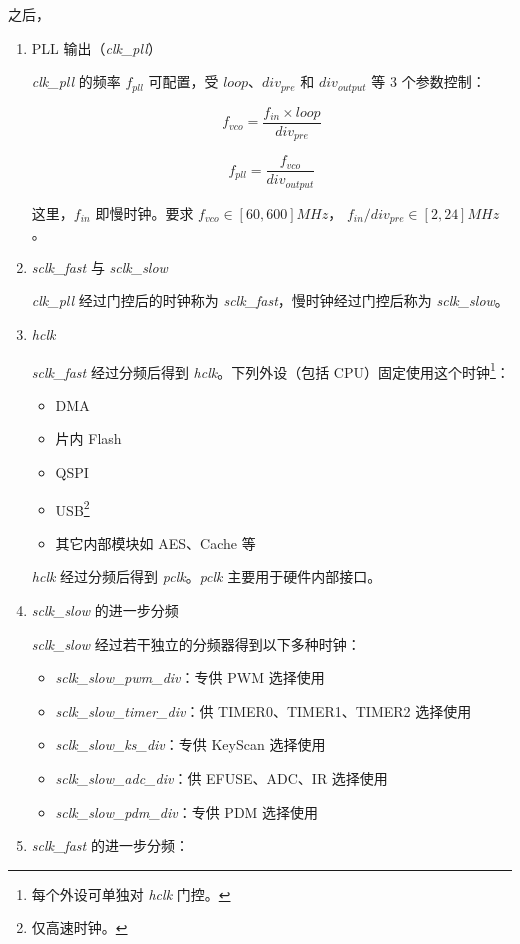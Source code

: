 \documentclass[
  12pt,
]{book}
\providecommand{\tightlist}{%
  \setlength{\itemsep}{0pt}\setlength{\parskip}{0pt}}
\begin{document}
之后，

\begin{enumerate}
\def\labelenumi{\arabic{enumi}.}
\item
  PLL 输出（\emph{clk\_pll}）

  \emph{clk\_pll} 的频率 \(f_{pll}\) 可配置，受 \(loop\)、\(div_{pre}\) 和 \(div_{output}\) 等 3 个参数控制：

  \[f_{vco}=\frac{f_{in}\times loop}{div_{pre}}\]

  \[f_{pll}=\frac{f_{vco}}{div_{output}}\]

  这里，\(f_{in}\) 即慢时钟。要求 \(f_{vco} \in [60,600]MHz\)， \(f_{in}/div_{pre} \in [2,24]MHz\)。
\item
  \emph{sclk\_fast} 与 \emph{sclk\_slow}

  \emph{clk\_pll} 经过门控后的时钟称为 \emph{sclk\_fast}，慢时钟经过门控后称为 \emph{sclk\_slow}。
\item
  \emph{hclk}

  \emph{sclk\_fast} 经过分频后得到 \emph{hclk}。下列外设（包括 CPU）固定使用这个时钟\footnote{每个外设可单独对 \emph{hclk} 门控。}：

  \begin{itemize}
  \tightlist
  \item
    DMA
  \item
    片内 Flash
  \item
    QSPI
  \item
    USB\footnote{仅高速时钟。}
  \item
    其它内部模块如 AES、Cache 等
  \end{itemize}

  \emph{hclk} 经过分频后得到 \emph{pclk}。\emph{pclk} 主要用于硬件内部接口。
\item
  \emph{sclk\_slow} 的进一步分频

  \emph{sclk\_slow} 经过若干独立的分频器得到以下多种时钟：

  \begin{itemize}
  \tightlist
  \item
    \emph{sclk\_slow\_pwm\_div}：专供 PWM 选择使用
  \item
    \emph{sclk\_slow\_timer\_div}：供 TIMER0、TIMER1、TIMER2 选择使用
  \item
    \emph{sclk\_slow\_ks\_div}：专供 KeyScan 选择使用
  \item
    \emph{sclk\_slow\_adc\_div}：供 EFUSE、ADC、IR 选择使用
  \item
    \emph{sclk\_slow\_pdm\_div}：专供 PDM 选择使用
  \end{itemize}
\item
  \emph{sclk\_fast} 的进一步分频：


\end{enumerate}
\end{document}
